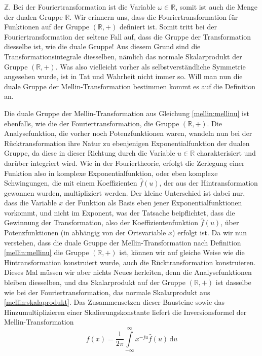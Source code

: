 $\mathbb{Z}$. 
Bei der Fouriertransformation ist die Variable $\omega \in \mathbb{R}$, 
somit ist auch die Menge der dualen Gruppe $\mathbb{R}$.
Wir erinnern uns, dass die Fouriertransformation für Funktionen auf der 
Gruppe $(\mathbb{R},+)$ definiert ist. 
Somit tritt bei der Fouriertransformation der seltene Fall auf, dass die 
Gruppe der Transformation diesselbe ist, wie die duale Gruppe!
Aus diesem Grund sind die Transformationsintegrale diesselben, nämlich das 
normale Skalarprodukt der Gruppe $(\mathbb{R},+)$.
Was also vielleicht vorher als selbstverständliche Symmetrie angesehen 
wurde, ist in Tat und Wahrheit nicht immer so.
Will man nun die duale Gruppe der Mellin-Transformation bestimmen kommt 
es auf die Definition an. 

Die duale Gruppe der Mellin-Transformation aus Gleichung 
\eqref{mellin:mellinu} ist ebenfalls, wie die der Fouriertransformation, 
die Gruppe $(\mathbb{R},+)$.
Die Analysefunktion, die vorher noch Potenzfunktionen waren, wandeln nun 
bei der Rücktransformation ihre Natur zu ebenjenigen Exponentialfunktion
der dualen Gruppe, da diese in dieser Richtung durch die Variable 
$u \in \mathbb{R}$ charakterisiert und darüber integriert wird.
Wie in der Fouriertheorie, erfolgt die Zerlegung einer Funktion also in 
komplexe Exponentialfunktion, oder eben komplexe Schwingungen, die mit 
einem Koeffizienten $\hat{f}(u)$, der aus der Hintransformation gewonnen 
wurden, multipliziert werden.
Der kleine Unterschied ist dabei nur, dass die Variable $x$ der Funktion 
als Basis eben jener Exponentialfunktionen vorkommt, und nicht im Exponent, 
was der Tatsache beipflichtet, dass die Gewinnung der Transformation, 
also der Koeffizientenfunktion $\hat{f}(u)$, über Potenzfunktionen 
(in abhängig von der Ortsvariable $x$) erfolgt ist.
Da wir nun verstehen, dass die duale Gruppe der Mellin-Transformation nach 
Definition \eqref{mellin:mellinu} die Gruppe $(\mathbb{R},+)$ ist, können 
wir auf gleiche Weise wie die Hintransformation konstruiert wurde, auch 
die Rücktransformation konstruieren.
Dieses Mal müssen wir aber nichts Neues herleiten, denn die 
Analysefunktionen bleiben diesselben, und das Skalarprodukt auf der Gruppe 
$(\mathbb{R},+)$ ist dasselbe wie bei der Fouriertransformation, das 
normale Skalarprodukt aus \eqref{mellin:skalaprodukt}. 
Das Zusammensetzen dieser Bausteine sowie das Hinzumultiplizieren einer 
Skalierungskonstante liefert die Inversionsformel der Mellin-Transformation
\begin{equation}
    f(x) = \frac{1}{2\pi} \int\limits_{-\infty}^{\infty} 
    x^{-ju} \hat{f}(u) \,\mathrm{d}u
    \label{mellin:mellininvu}
\end{equation}

